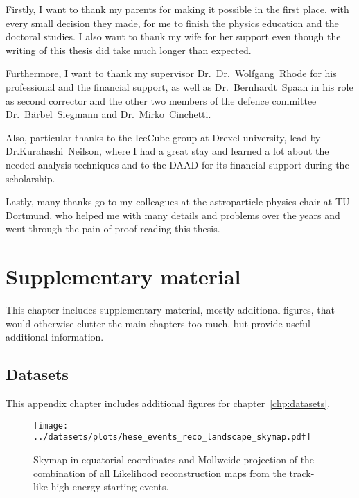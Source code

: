 Firstly, I want to thank my parents for making it possible in the first place, with every small decision they made, for me to finish the physics education and the doctoral studies.
I also want to thank my wife for her support even though the writing of this thesis did take much longer than expected.

Furthermore, I want to thank my supervisor Dr.~Dr.~Wolfgang~Rhode for his professional and the financial support, as well as Dr.~Bernhardt~Spaan in his role as second corrector and the other two members of the defence committee Dr.~Bärbel~Siegmann and Dr.~Mirko~Cinchetti.

Also, particular thanks to the IceCube group at Drexel university, lead by Dr.Kurahashi~Neilson, where I had a great stay and learned a lot about the needed analysis techniques and to the DAAD for its financial support during the scholarship.

Lastly, many thanks go to my colleagues at the astroparticle physics chair at TU Dortmund, who helped me with many details and problems over the years and went through the pain of proof-reading this thesis.

\chapter{Supplementary material}
This chapter includes supplementary material, mostly additional figures, that would otherwise clutter the main chapters too much, but provide useful additional information.


\section{Datasets}
This appendix chapter includes additional figures for chapter~\ref{chp:datasets}.

\begin{figure}[H]
  \centering
  \texttt{[image: ../datasets/plots/hese\_events\_reco\_landscape\_skymap.pdf]}
  \caption[Combined Likelihood skymap of the 22 HES events]{
    Skymap in equatorial coordinates and Mollweide projection of the combination of all Likelihood reconstruction maps from the track-like high energy starting events.
  }
  \label{fig:hese_events_reco_landscape_skymap}
\end{figure}

